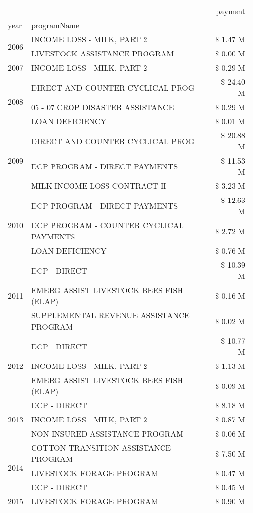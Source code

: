 \begin{tabular}{llr}
\toprule
 &  & payment \\
year & programName &  \\
\midrule
\multirow[t]{2}{*}{2006} & INCOME LOSS - MILK, PART 2 & \$ 1.47 M \\
 & LIVESTOCK ASSISTANCE PROGRAM & \$ 0.00 M \\
\cline{1-3}
2007 & INCOME LOSS - MILK, PART 2 & \$ 0.29 M \\
\cline{1-3}
\multirow[t]{3}{*}{2008} & DIRECT AND COUNTER CYCLICAL PROG & \$ 24.40 M \\
 & 05 - 07 CROP DISASTER ASSISTANCE & \$ 0.29 M \\
 & LOAN DEFICIENCY & \$ 0.01 M \\
\cline{1-3}
\multirow[t]{3}{*}{2009} & DIRECT AND COUNTER CYCLICAL PROG & \$ 20.88 M \\
 & DCP PROGRAM - DIRECT PAYMENTS & \$ 11.53 M \\
 & MILK INCOME LOSS CONTRACT II & \$ 3.23 M \\
\cline{1-3}
\multirow[t]{3}{*}{2010} & DCP PROGRAM - DIRECT PAYMENTS & \$ 12.63 M \\
 & DCP PROGRAM - COUNTER CYCLICAL PAYMENTS & \$ 2.72 M \\
 & LOAN DEFICIENCY & \$ 0.76 M \\
\cline{1-3}
\multirow[t]{3}{*}{2011} & DCP - DIRECT & \$ 10.39 M \\
 & EMERG ASSIST LIVESTOCK BEES FISH (ELAP) & \$ 0.16 M \\
 & SUPPLEMENTAL REVENUE ASSISTANCE PROGRAM & \$ 0.02 M \\
\cline{1-3}
\multirow[t]{3}{*}{2012} & DCP - DIRECT & \$ 10.77 M \\
 & INCOME LOSS - MILK, PART 2 & \$ 1.13 M \\
 & EMERG ASSIST LIVESTOCK BEES FISH (ELAP) & \$ 0.09 M \\
\cline{1-3}
\multirow[t]{3}{*}{2013} & DCP - DIRECT & \$ 8.18 M \\
 & INCOME LOSS - MILK, PART 2 & \$ 0.87 M \\
 & NON-INSURED ASSISTANCE PROGRAM & \$ 0.06 M \\
\cline{1-3}
\multirow[t]{3}{*}{2014} & COTTON TRANSITION ASSISTANCE PROGRAM & \$ 7.50 M \\
 & LIVESTOCK FORAGE PROGRAM & \$ 0.47 M \\
 & DCP - DIRECT & \$ 0.45 M \\
\cline{1-3}
\multirow[t]{3}{*}{2015} & LIVESTOCK FORAGE PROGRAM & \$ 0.90 M \\

\end{tabular}

